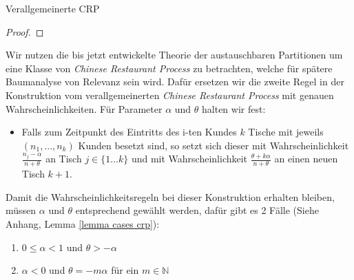 \begin{section}{Verallgemeinerte CRP}
\begin{proof}
\end{proof}
Wir nutzen die bis jetzt entwickelte Theorie der austauschbaren Partitionen um eine Klasse von \textit{Chinese Restaurant Process} zu betrachten, welche für spätere Baumanalyse von Relevanz sein wird. Dafür ersetzen wir die zweite Regel in der Konstruktion vom verallgemeinerten \textit{Chinese Restaurant Process} mit genauen Wahrscheinlichkeiten. Für Parameter $\alpha$ und $\theta$ halten wir fest:
\begin{itemize} 
    \item Falls zum Zeitpunkt des Eintritts des i-ten Kundes $k$ Tische mit jeweils $(n_1,...,n_k)$ Kunden besetzt sind, so setzt sich dieser mit Wahrscheinlichkeit $\frac{n_j-\alpha}{n + \theta}$ an Tisch $j \in \{1...k\}$ und mit Wahrscheinlichkeit $\frac{\theta + k\alpha}{n + \theta}$ an einen neuen Tisch $k+1$.
\end{itemize}
Damit die Wahrscheinlichkeitsregeln bei dieser Konstruktion erhalten bleiben, müssen $\alpha$ und $\theta$ entsprechend gewählt werden, dafür gibt es 2 Fälle (Siehe Anhang, Lemma \ref{lemma cases crp}): 
\begin{enumerate}
    \item $ 0 \leq \alpha < 1$ und $\theta > - \alpha $ 
    \item $\alpha < 0$ und $\theta = -m \alpha$ für ein $m \in \mathbb{N}$
\end{enumerate}


\end{section}
